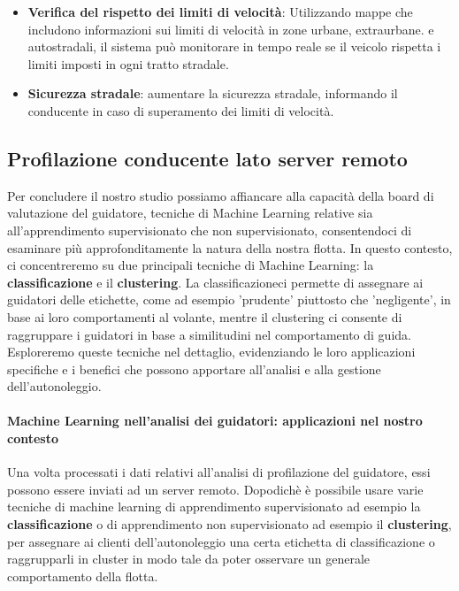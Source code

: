 \documentclass[12pt, a4paper, italian]{report}
\numberwithin{figure}{chapter}
\numberwithin{table}{chapter}
\begin{document}
\begin{itemize}
    \item \textbf{Verifica del rispetto dei limiti di velocità}: Utilizzando mappe che includono informazioni sui limiti di velocità in zone urbane, extraurbane. e autostradali, il sistema può monitorare in tempo reale se il veicolo rispetta i limiti imposti in ogni tratto stradale.
    \item \textbf{Sicurezza stradale}: aumentare la sicurezza stradale, informando il conducente in caso di superamento dei limiti di velocità. 
\end{itemize}

\subsection{Profilazione conducente lato server remoto}
Per concludere il nostro studio possiamo affiancare alla capacità della board di valutazione del guidatore, tecniche di Machine Learning relative sia all'apprendimento supervisionato che non supervisionato, consentendoci di esaminare più approfonditamente la natura della nostra flotta. In questo contesto, ci concentreremo su due principali tecniche di Machine Learning: la \textbf{classificazione} e il \textbf{clustering}. La classificazioneci permette di assegnare ai guidatori delle etichette, come ad esempio 'prudente' piuttosto che 'negligente', in base ai loro comportamenti al volante, mentre il clustering ci consente di raggruppare i guidatori in base a similitudini nel comportamento di guida. Esploreremo queste tecniche nel dettaglio, evidenziando le loro applicazioni specifiche e i benefici che possono apportare all'analisi e alla gestione dell'autonoleggio.

\vspace{0.5cm}
\paragraph{Machine Learning nell'analisi dei guidatori: applicazioni nel nostro contesto}
Una volta processati i dati relativi all'analisi di profilazione del guidatore, essi possono essere inviati ad un server remoto. Dopodichè è possibile usare varie tecniche di machine learning di apprendimento supervisionato ad esempio la \textbf{classificazione} o di apprendimento non supervisionato ad esempio il \textbf{clustering}, per assegnare ai clienti dell'autonoleggio una certa etichetta di classificazione o raggrupparli in cluster in modo tale da poter osservare un generale comportamento della flotta.
\end{document}

